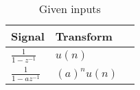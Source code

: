 \begin{table}[htbp]
    \centering
    \def\arraystrech{1.5}
        \begin{tabular}{|p{2.5cm}|p{1.5cm}|p{3cm}|}
    \hline
            \textbf{Signal} & \textbf{Transform} \\
    \hline
            $ \frac{1}{1-z^{-1}} $ & $u(n)$ & \\
    \hline
            $ \frac{1}{1-az^{-1}}$ & $(a)^{n}u(n)$ \\
    \hline
    \end{tabular}
    \caption{Given inputs}
    \label{pairs}
\end{table} 
    